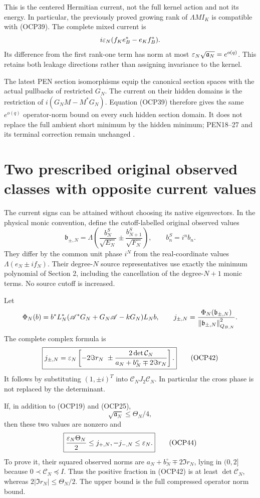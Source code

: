 \documentclass[10pt]{article}
\begin{document}
This is the centered Hermitian current, not the full kernel action and not its energy. In particular, the previously proved growing rank of $\Lambda MI_K$ is compatible with (OCP39). The complete mixed current is
\[
 i\varepsilon_N(f_Ke_B^*-e_Kf_B^*).
\]
Its difference from the first rank-one term has norm at most $\varepsilon_N\sqrt{\mathfrak a_N}=e^{o(q)}$. This retains both leakage directions rather than assigning invariance to the kernel.

The latest PEN section isomorphisms equip the canonical section spaces with the actual pullbacks of restricted $G_N$. The current on their hidden domains is the restriction of $i(G_NM-M^*G_N)$. Equation (OCP39) therefore gives the same $e^{o(q)}$ operator-norm bound on every such hidden section domain. It does not replace the full ambient short minimum by the hidden minimum; PEN18--27 and its terminal correction remain unchanged \cite{pen}.

\section[Prescribed signed observed classes]{Two prescribed original observed classes with opposite current values}
The current signs can be attained without choosing its native eigenvectors. In the physical monic convention, define the cutoff-labelled original observed values
\[
 \mathfrak b_{\pm,N}
 =\Lambda\left(\frac{b_N^S}{\sqrt{E_N}}
 \pm\frac{b_{N+1}^S}{\sqrt{F_N}}\right),
 \qquad b_n^S=i^nb_n.
 \tag{OCP41}
\]
They differ by the common unit phase $i^N$ from the real-coordinate values $\Lambda(e_N\pm if_N)$. Their degree-$N$ source representatives use exactly the minimum polynomial of Section 2, including the cancellation of the degree-$N+1$ monic terms. No source cutoff is increased.

Let
\[
 \Phi_N(b)=b^*L_N^*(\mathscr A^*G_N+G_N\mathscr A-kG_N)L_Nb,
 \qquad j_{\pm,N}=\frac{\Phi_N(\mathfrak b_{\pm,N})}
 {\left\lVert\mathfrak b_{\pm,N}\right\rVert_{Q_{B,N}}^2}.
\]
The complete complex formula is
\[
 \boxed{j_{\pm,N}=\varepsilon_N\left[
 -2\Im r_N\ \pm\frac{2\det\mathcal C_N}
 {a_N+b_N^{\circ}\mp2\Im r_N}\right].}
 \tag{OCP42}
\]
It follows by substituting $(1,\pm i)^T$ into $\mathcal C_NJ_2\mathcal C_N$. In particular the cross phase is not replaced by the determinant.

If, in addition to (OCP19) and (OCP25),
\[
 \sqrt{\mathfrak a_N}\le\Theta_N/4,
 \tag{OCP43}
\]
then these two values are nonzero and
\[
 \boxed{\frac{\varepsilon_N\Theta_N}{2}
 \le j_{+,N},-j_{-,N}\le\varepsilon_N.}
 \tag{OCP44}
\]
To prove it, their squared observed norms are
$a_N+b_N^{\circ}\mp2\Im r_N$, lying in $(0,2]$ because $0\prec\mathcal C_N\preceq I$. Thus the positive fraction in (OCP42) is at least $\det\mathcal C_N$, whereas $2|\Im r_N|\le\Theta_N/2$. The upper bound is the full compressed operator norm bound.
\end{document}
